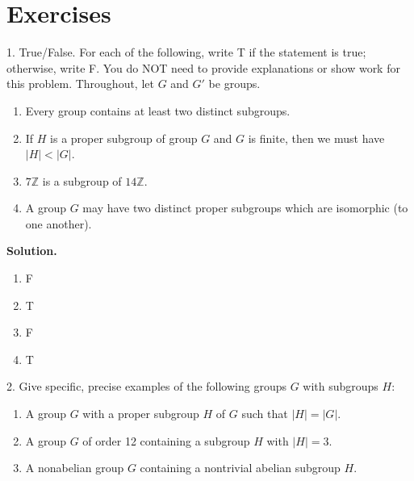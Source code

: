 \documentclass[10pt,]{book}
\theoremstyle{plain}
\theoremstyle{definition}
\theoremstyle{definition}
\theoremstyle{definition}
\theoremstyle{definition}
\numberwithin{equation}{section}
\def\Z{\mathbb{Z}}
\newcommand{\lt}{<}
\begin{document}
\section[{Exercises}]{Exercises}\label{exercises-5}
\begin{exerciselist}
\item[1.]\hypertarget{exercise-28}{}True/False. For each of the following, write T if the statement is true; otherwise, write F. You do NOT need to provide explanations or show work for this problem. Throughout, let \(G\) and \(G'\) be groups. \leavevmode%
\begin{enumerate}[label=(\alph*)]
\item\hypertarget{li-212}{}Every group contains at least two distinct subgroups.%
\item\hypertarget{li-213}{}If \(H\) is a proper subgroup of group \(G\) and \(G\) is finite, then we must have \(|H|\lt |G|\).%
\item\hypertarget{li-214}{}\(7\Z\) is a subgroup of \(14\Z\).%
\item\hypertarget{li-215}{}A group \(G\) may have two distinct proper subgroups which are isomorphic (to one another).%
\end{enumerate}
%
\par\smallskip
\par\smallskip
\noindent\textbf{Solution.}\hypertarget{solution-28}{}\quad
\leavevmode%
\begin{multicols}{4}
\begin{enumerate}[label=(\alph*)]
\item\hypertarget{li-216}{}F%
\item\hypertarget{li-217}{}T%
\item\hypertarget{li-218}{}F%
\item\hypertarget{li-219}{}T%
\end{enumerate}
\end{multicols}
\item[2.]\hypertarget{exercise-29}{}Give specific, precise examples of the following groups \(G\) with subgroups \(H\): \leavevmode%
\begin{enumerate}[label=(\alph*)]
\item\hypertarget{li-220}{}A group \(G\) with a proper subgroup \(H\) of \(G\) such that \(|H|=|G|\).%
\item\hypertarget{li-221}{}A group \(G\) of order 12 containing a subgroup \(H\) with \(|H|=3\).%
\item\hypertarget{li-222}{}A nonabelian group \(G\) containing a nontrivial abelian subgroup \(H\).%

\end{enumerate}
\end{exerciselist}
\end{document}
